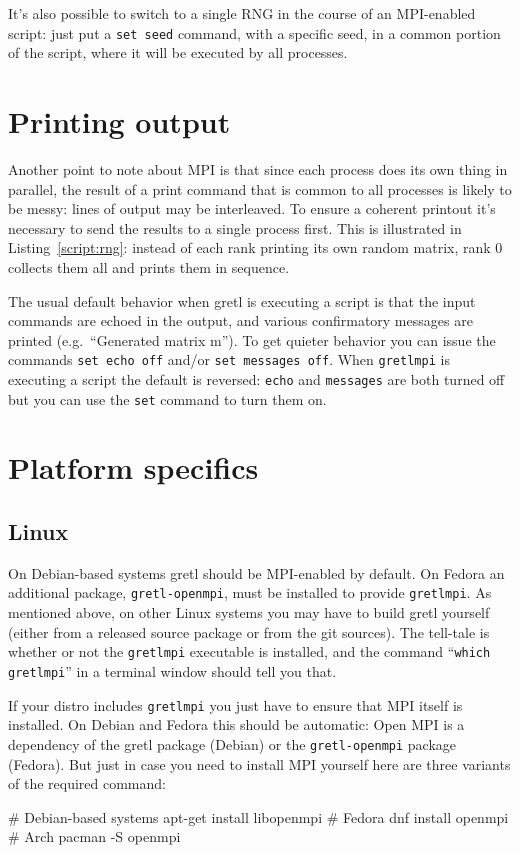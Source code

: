 \documentclass{article}
\begin{document}
It's also possible to switch to a single RNG in the course of an
MPI-enabled script: just put a \texttt{set seed} command, with a
specific seed, in a common portion of the script, where it will be
executed by all processes.

\section{Printing output}
\label{sec:printing}

Another point to note about MPI is that since each process does its
own thing in parallel, the result of a print command that is common to
all processes is likely to be messy: lines of output may be
interleaved. To ensure a coherent printout it's necessary to send the
results to a single process first. This is illustrated in
Listing~\ref{script:rng}: instead of each rank printing its own random
matrix, rank 0 collects them all and prints them in sequence.

The usual default behavior when gretl is executing a script is that
the input commands are echoed in the output, and various confirmatory
messages are printed (e.g.\ ``Generated matrix m''). To get quieter
behavior you can issue the commands \texttt{set echo off} and/or
\texttt{set messages off}. When \texttt{gretlmpi} is executing a
script the default is reversed: \texttt{echo} and \texttt{messages}
are both turned off but you can use the \texttt{set} command to turn
them on.


\section{Platform specifics}
\label{sec:platforms}

\subsection{Linux}
\label{subsec:linux}

On Debian-based systems gretl should be MPI-enabled by default.  On
Fedora an additional package, \texttt{gretl-openmpi}, must be
installed to provide \texttt{gretlmpi}.  As mentioned above, on other
Linux systems you may have to build gretl yourself (either from a
released source package or from the git sources). The tell-tale is
whether or not the \texttt{gretlmpi} executable is installed, and the
command ``\texttt{which gretlmpi}'' in a terminal window should tell
you that.

If your distro includes \texttt{gretlmpi} you just have to ensure that
MPI itself is installed. On Debian and Fedora this should be
automatic: \textsf{Open MPI} is a dependency of the gretl package
(Debian) or the \texttt{gretl-openmpi} package (Fedora). But just in
case you need to install MPI yourself here are three variants of the
required command:
\begin{code}
# Debian-based systems
apt-get install libopenmpi
# Fedora
dnf install openmpi
# Arch
pacman -S openmpi
\end{code}
\end{document}
